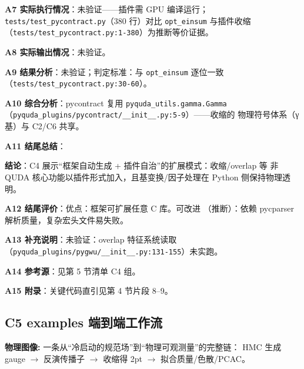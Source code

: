 \documentclass[UTF8]{ctexart}
\begin{document}
\textbf{A7 实际执行情况}：\textcolor{warn}{未验证}——插件需 GPU 编译运行；
\texttt{tests/test\_pycontract.py}（380 行）对比 \texttt{opt\_einsum} 与插件收缩
（\texttt{\nolinkurl{tests/test_pycontract.py:1-380}}）为\textcolor{phys}{推断}等价证据。

\textbf{A8 实际输出情况}：\textcolor{warn}{未验证}。

\textbf{A9 结果分析}：\textcolor{warn}{未验证}；判定标准：与 \texttt{opt\_einsum}
逐位一致（\texttt{\nolinkurl{tests/test_pycontract.py:30-60}}）。

\textbf{A10 综合分析}：pycontract 复用 \texttt{pyquda\_utils.gamma.Gamma}
（\texttt{\nolinkurl{pyquda_plugins/pycontract/__init__.py:5-9}}）——收缩的
物理符号体系（γ 基）与 C2/C6 共享。

\textbf{A11 结尾总结}：
\begin{conclbox}
\textbf{结论}：C4 展示“框架自动生成 + 插件自治”的扩展模式：收缩/overlap 等
非 QUDA 核心功能以插件形式加入，且基变换/因子处理在 Python 侧保持物理透明。
\end{conclbox}

\textbf{A12 结尾评价}：优点：框架可扩展任意 C 库。可改进
（\textcolor{phys}{推断}）：依赖 pycparser 解析质量，复杂宏头文件易失败。

\textbf{A13 补充说明}：\textcolor{warn}{未验证}：overlap 特征系统读取
（\texttt{\nolinkurl{pyquda_plugins/pygwu/__init__.py:131-155}}）未实跑。

\textbf{A14 参考源}：见第 5 节清单 C4 组。

\textbf{A15 附录}：关键代码直引见第 4 节片段 8–9。

\subsection{C5 examples 端到端工作流}

\begin{physbox}
\textbf{物理图像:} 一条从“冷启动的规范场”到“物理可观测量”的完整链：
HMC 生成 gauge  $\rightarrow$  反演传播子  $\rightarrow$  收缩得 2pt  $\rightarrow$  拟合质量/色散/PCAC。
\end{physbox}
\end{document}
